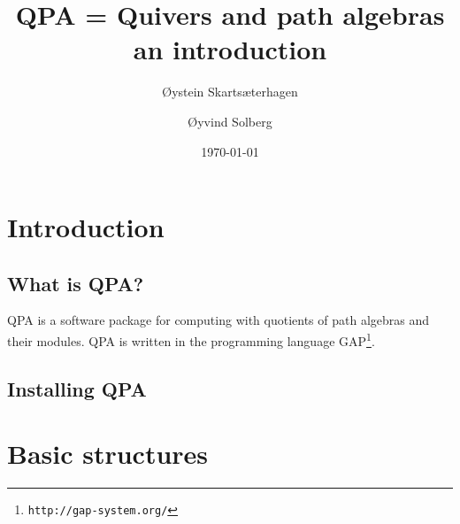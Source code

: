 \documentclass{amsart}
\theoremstyle{definition}
\theoremstyle{theoretic}
\begin{document}
\title[QPA -- an introduction]{QPA = Quivers and path algebras\\an introduction} 

\author[Skarts\ae terhagen]{\O ystein  Skarts\ae terhagen}
\address{\O ystein Skarts\ae terhagen\\
Institutt for matematiske fag\\
NTNU\\ 
N--7491 Trondheim\\ 
Norway}

\author[Solberg]{\O yvind Solberg}
\address{\O yvind Solberg\\
Institutt for matematiske fag\\
NTNU\\ 
N--7491 Trondheim\\ 
Norway}

\date{\today}

\begin{abstract}
\end{abstract}

\maketitle



\section{Introduction}

\subsection{What is QPA?\nopunct}

QPA is a software package for computing with quotients of path
algebras and their modules.  QPA is written in the programming
language GAP\footnote{\texttt{http://gap-system.org/}}.



\subsection{Installing QPA}




\section{Basic structures}
\end{document}
